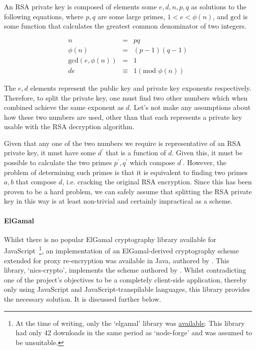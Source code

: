 An RSA private key is composed of elements some $e, d, n, p, q$ as solutions to the following equations, where $p, q$ are some large primes, $1 < e < \phi(n)$, and $\text{gcd}$ is some function that calculates the greatest common denominator of two integers.

$$
\begin{aligned}
  n &=& pq \\
  \phi(n) &=& (p - 1)(q - 1) \\
  \text{gcd}(e, \phi(n)) &=& 1 \\
  de & \equiv & 1 (\text{mod } \phi(n))
\end{aligned}
$$

The $e, d$ elements represent the public key and private key exponents respectively. Therefore, to split the private key, one must find two other numbers which when combined achieve the same exponent as $d$. Let's not make any assumptions about how these two numbers are used, other than that each represents a private key usable with the RSA decryption algorithm.

Given that any one of the two numbers we require is representative of an RSA private key, it must have some $d^\prime$ that is a function of $d$. Given this, it must be possible to calculate the two primes $p^\prime, q^\prime$ which compose $d^\prime$. However, the problem of determining such primes is that it is equivalent to finding two primes $a, b$ that compose $d$, i.e. cracking the original RSA encryption. Since this has been proven to be a hard problem, we can safely assume that splitting the RSA private key in this way is at least non-trivial and certainly impractical as a scheme.


\paragraph{ElGamal}

Whilst there is no popular ElGamal cryptography library available for JavaScript~\footnote{At the time of writing, only the `elgamal' library was \href{https://www.npmjs.com/package/elgamal}{available}. This library had only 42 downloads in the same period as `node-forge' and was assumed to be unsuitable.}, an implementation of an ElGamal-derived cryptography scheme extended for proxy re-encryption was available in Java, authored by \cite{nicscrypto:2012:online}. This library, `nics-crypto', implements the scheme authored by \cite{afgh:2006:article}. Whilst contradicting one of the project's objectives to be a completely client-side application, thereby only using JavaScript and JavaScript-transpilable languages, this library provides the necessary solution. It is discussed further below.
